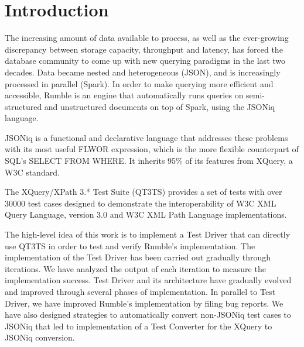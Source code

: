 
\chapter{Introduction}
\label{chapter:introduction}
The increasing amount of data available to process, as well as the ever-growing discrepancy between storage capacity, throughput and latency, has forced the database community to come up with new querying paradigms in the last two decades. Data became nested and heterogeneous (JSON), and is increasingly processed in parallel (Spark). In order to make querying more efficient and accessible, Rumble \cite{RumblePaper} is an engine that automatically runs queries on semi-structured and unstructured documents on top of Spark, using the JSONiq language. 

JSONiq \cite{JSONIQORG} is a functional and declarative language that addresses these problems with its most useful FLWOR expression, which is the more flexible counterpart of SQL’s SELECT FROM WHERE. It inherits 95\% of its features from XQuery, a W3C standard.

The XQuery/XPath 3.* Test Suite (QT3TS) \cite{TestSuite} provides a set of tests with over 30000 test cases designed to demonstrate the interoperability of W3C XML Query Language, version 3.0 and W3C XML Path Language implementations.

The high-level idea of this work is to implement a Test Driver that can directly use QT3TS in order to test and verify Rumble's implementation. The implementation of the Test Driver has been carried out gradually through iterations. We have analyzed the output of each iteration to measure the implementation success. Test Driver and its architecture have gradually evolved and improved through several phases of implementation. In parallel to Test Driver, we have improved Rumble's implementation by filing bug reports. We have also designed strategies to automatically convert non-JSONiq test cases to JSONiq that led to implementation of a Test Converter for the XQuery to JSONiq conversion.